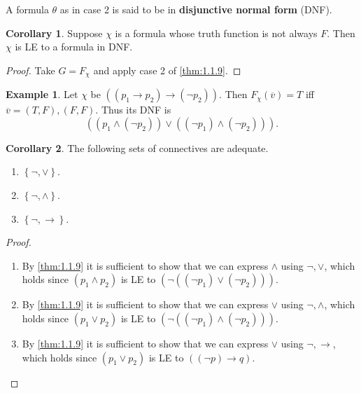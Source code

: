 \documentclass{article}
\newcommand{\rb}[1]{\left( #1 \right)}
\newcommand{\cb}[1]{\left\{ #1 \right\}}
\newcommand{\notb}[1]{\rb{\neg #1}}
\newcommand{\orb}[2]{\rb{#1 \lor #2}}
\newcommand{\andb}[2]{\rb{#1 \land #2}}
\newcommand{\impb}[2]{\rb{#1 \rightarrow #2}}
\theoremstyle{definition}\newtheorem{definition}{Definition}[subsection]
\theoremstyle{definition}\newtheorem{remark}[definition]{Remark}
\theoremstyle{definition}\newtheorem*{example}{Example}
\theoremstyle{definition}\newtheorem*{note}{Note}
\newtheorem{corollary}[definition]{Corollary}
\begin{document}
A formula $ \theta $ as in case 2 is said to be in \textbf{disjunctive normal form} (DNF).

\begin{corollary}
Suppose $ \chi $ is a formula whose truth function is not always $ F $. Then $ \chi $ is LE to a formula in DNF.
\end{corollary}

\begin{proof}
Take $ G = F_\chi $ and apply case 2 of \ref{thm:1.1.9}.
\end{proof}

\begin{example}
Let $ \chi $ be $ \impb{\impb{p_1}{p_2}}{\notb{p_2}} $. Then $ F_\chi\rb{\overline{v}} = T $ iff $ \overline{v} = \rb{T, F}, \rb{F, F} $. Thus its DNF is
$$ \orb{\andb{p_1}{\notb{p_2}}}{\andb{\notb{p_1}}{\notb{p_2}}}. $$
\end{example}

\begin{corollary}
The following sets of connectives are adequate.
\begin{enumerate}
\item $ \cb{\neg, \lor} $.
\item $ \cb{\neg, \land} $.
\item $ \cb{\neg, \rightarrow} $.
\end{enumerate}
\end{corollary}

\begin{proof}
\hfill
\begin{enumerate}
\item By \ref{thm:1.1.9} it is sufficient to show that we can express $ \land $ using $ \neg, \lor $, which holds since $ \andb{p_1}{p_2} $ is LE to $ \notb{\orb{\notb{p_1}}{\notb{p_2}}} $.
\item By \ref{thm:1.1.9} it is sufficient to show that we can express $ \lor $ using $ \neg, \land $, which holds since $ \orb{p_1}{p_2} $ is LE to $ \notb{\andb{\notb{p_1}}{\notb{p_2}}} $.
\item By \ref{thm:1.1.9} it is sufficient to show that we can express $ \lor $ using $ \neg, \rightarrow $, which holds since $ \orb{p_1}{p_2} $ is LE to $ \impb{\notb{p}}{q} $.
\end{enumerate}
\end{proof}

\end{document}
